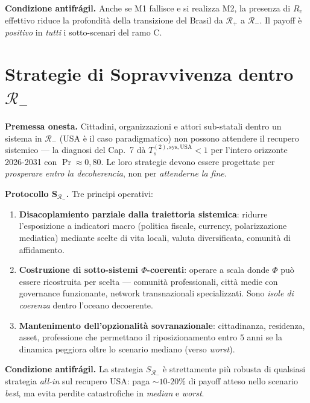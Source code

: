 \Proved{} \textbf{Condizione antifrágil.} Anche se M1 fallisce e si
realizza M2, la presenza di \(R_c\) effettivo riduce la profondità della
transizione del Brasil da \(\mathcal{R}_+\) a \(\mathcal{R}_-\). Il
payoff è \emph{positivo} in \emph{tutti} i sotto-scenari del ramo C.



\section{\texorpdfstring{Strategie di Sopravvivenza dentro
\(\mathcal{R}_-\)}{Strategie di Sopravvivenza dentro \textbackslash mathcal\{R\}\_-}}\label{strategie-di-sopravvivenza-dentro-mathcalr_-}

\Hypoth{} \textbf{Premessa onesta.} Cittadini, organizzazioni e attori
sub-statali dentro un sistema in \(\mathcal{R}_-\) (USA è il caso
paradigmatico) non possono attendere il recupero sistemico --- la
diagnosi del Cap.~7 dà \(T_s^{(2),\text{sys},\text{USA}} < 1\) per
l'intero orizzonte 2026-2031 con \(\Pr \approx 0{,}80\). Le loro
strategie devono essere progettate per \emph{prosperare entro la
decoherencia}, non per \emph{attenderne la fine}.

\Hypoth{} \textbf{Protocollo S\(_{\mathcal{R}_-}\).} Tre principi
operativi:

\begin{enumerate}
\def\labelenumi{\arabic{enumi}.}
\tightlist
\item
  \textbf{Disacoplamiento parziale dalla traiettoria sistemica}:
  ridurre l'esposizione a indicatori macro (politica fiscale, currency,
  polarizzazione mediatica) mediante scelte di vita locali, valuta
  diversificata, comunità di affidamento.
\item
  \textbf{Costruzione di sotto-sistemi \(\Phi\)-coerenti}: operare a
  scala donde \(\Phi\) può essere ricostruita per scelta --- comunità
  professionali, città medie con governance funzionante, network
  transnazionali specializzati. Sono \emph{isole di coerenza} dentro
  l'oceano decoerente.
\item
  \textbf{Mantenimento dell'opzionalità sovranazionale}: cittadinanza,
  residenza, asset, professione che permettano il riposizionamento entro
  \(5\) anni se la dinamica peggiora oltre lo scenario mediano (verso
  \emph{worst}).
\end{enumerate}

\Proved{} \textbf{Condizione antifrágil.} La strategia
\(S_{\mathcal{R}_-}\) è strettamente più robusta di qualsiasi strategia
\emph{all-in} sul recupero USA: paga \(\sim 10\)-\(20\%\) di payoff
atteso nello scenario \emph{best}, ma evita perdite catastrofiche in
\emph{median} e \emph{worst}.



